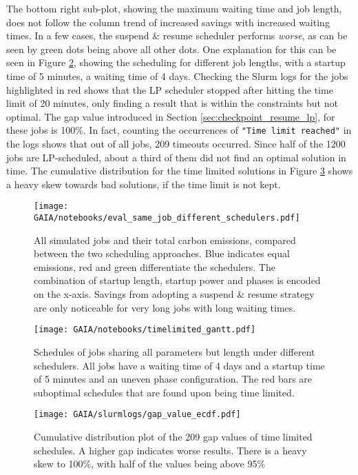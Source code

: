 The bottom right sub-plot, showing the maximum waiting time and job length, does not follow the column trend of increased savings with increased waiting times. In a few cases, the suspend \& resume scheduler performs \emph{worse}, as can be seen by green dots being above all other dots.
One explanation for this can be seen in Figure \ref{fig:timelimited_gantt}, showing the scheduling for different job lengths, with a startup time of 5 minutes, a waiting time of 4 days.
Checking the Slurm logs for the jobs highlighted in red shows that the LP scheduler stopped after hitting the time limit of 20 minutes, only finding a result that is within the constraints but not optimal.
The gap value introduced in Section \ref{sec:checkpoint_resume_lp}, for these jobs is 100\%.
In fact, counting the occurrences of \verb|"Time limit reached"| in the logs shows that out of all jobs, 209 timeouts occurred. 
Since half of the 1200 jobs are LP-scheduled, about a third of them did not find an optimal solution in time.
The cumulative distribution for the time limited solutions in Figure \ref{fig:ecdf_gap} shows a heavy skew towards bad solutions, if the time limit is not kept.

\begin{figure}
    \texttt{[image: GAIA/notebooks/eval\_same\_job\_different\_schedulers.pdf]}
    \caption[short]{All simulated jobs and their total carbon emissions, compared between the two scheduling approaches. Blue indicates equal emissions, red and green differentiate the schedulers. The combination of startup length, startup power and phases is encoded on the x-axis. Savings from adopting a suspend \& resume strategy are only noticeable for very long jobs with long waiting times.}
    \label{fig:eval_different_schedulers}
\end{figure}

\begin{figure}
    \texttt{[image: GAIA/notebooks/timelimited\_gantt.pdf]}
    \caption[short]{Schedules of jobs sharing all parameters but length under different schedulers. All jobs have a waiting time of 4 days and a startup time of 5 minutes and an uneven phase configuration. The red bars are suboptimal schedules that are found upon being time limited.}
    \label{fig:timelimited_gantt}
\end{figure}

\begin{figure}
    \texttt{[image: GAIA/slurmlogs/gap\_value\_ecdf.pdf]}
    \caption[short]{Cumulative distribution plot of the 209 gap values of time limited schedules. A higher gap indicates worse results. There is a heavy skew to 100\%, with half of the values being above 95\%}
    \label{fig:ecdf_gap}
\end{figure}

